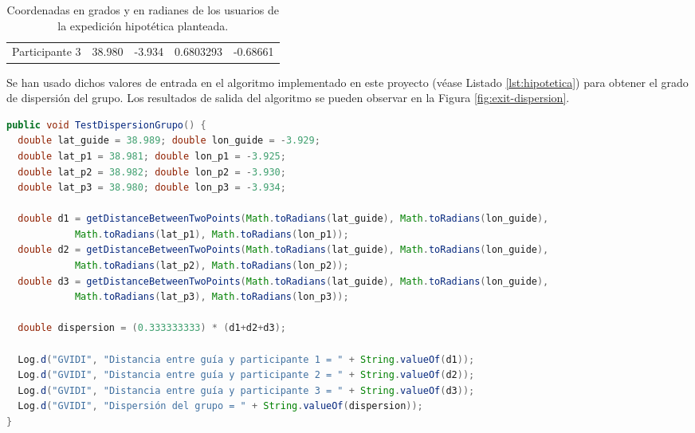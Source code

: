 \begin{table}[!h]
\begin{tabular}{lcccc}
\rowcolor[HTML]{EFEFEF} 
{\color[HTML]{000000} Participante 3}                                               & {\color[HTML]{000000} 38.980}                                                               & {\color[HTML]{000000} -3.934}                                                                & {\color[HTML]{000000} 0.6803293}                                                              & {\color[HTML]{000000} -0.68661}                                                               
\end{tabular}
\caption{Coordenadas en grados y en radianes de los usuarios de la expedición hipotética planteada.}
\label{table:situation-hipotetica}
\end{table}

Se han usado dichos valores de entrada en el algoritmo implementado en este proyecto (véase Listado \ref{lst:hipotetica}) para obtener el grado de dispersión del grupo. Los resultados de salida del algoritmo se pueden observar en la Figura \ref{fig:exit-dispersion}.

\begin{lstlisting}[language=java,captionpos=t,caption={\textbf{Test de análisis del grado de dispersión en una situación hipotética planteada.}},label={lst:hipotetica}]
public void TestDispersionGrupo() {
  double lat_guide = 38.989; double lon_guide = -3.929;
  double lat_p1 = 38.981; double lon_p1 = -3.925;
  double lat_p2 = 38.982; double lon_p2 = -3.930;
  double lat_p3 = 38.980; double lon_p3 = -3.934;

  double d1 = getDistanceBetweenTwoPoints(Math.toRadians(lat_guide), Math.toRadians(lon_guide),
            Math.toRadians(lat_p1), Math.toRadians(lon_p1));
  double d2 = getDistanceBetweenTwoPoints(Math.toRadians(lat_guide), Math.toRadians(lon_guide),
            Math.toRadians(lat_p2), Math.toRadians(lon_p2));
  double d3 = getDistanceBetweenTwoPoints(Math.toRadians(lat_guide), Math.toRadians(lon_guide),
            Math.toRadians(lat_p3), Math.toRadians(lon_p3));

  double dispersion = (0.333333333) * (d1+d2+d3);

  Log.d("GVIDI", "Distancia entre guía y participante 1 = " + String.valueOf(d1));
  Log.d("GVIDI", "Distancia entre guía y participante 2 = " + String.valueOf(d2));
  Log.d("GVIDI", "Distancia entre guía y participante 3 = " + String.valueOf(d3));
  Log.d("GVIDI", "Dispersión del grupo = " + String.valueOf(dispersion));
}
\end{lstlisting}

